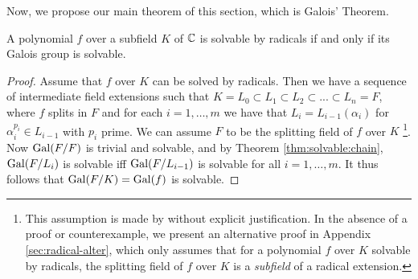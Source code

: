 Now, we propose our main theorem of this section, which is Galois' Theorem. 

\begin{theorem}\label{thm:galois-theorem}
	A polynomial $f$ over a subfield $K$ of $\mathbb C$ is solvable by radicals if and only if its Galois group is solvable.
\end{theorem}

\begin{proof}
	Assume that $f$ over $K$ can be solved by radicals. Then we have a sequence of intermediate field extensions such that $K = L_0 \subset L_1 \subset L_2 \subset ... \subset L_n =F$, where $f$ splits in $F$ and for each $i = 1, \dots, m$ we have that  $L_i = L_{i-1} (\alpha_i)$ for $\alpha_i ^ {p_i} \in L_{i-1}$ with $p_i$ prime. We can assume $F$ to be the splitting field of $f$ over $K$ \footnote[2]{This assumption is made by \cite[p.~75]{introduction-to-galois-theory} without explicit justification. In the absence of a proof or counterexample, we present an alternative proof in Appendix \ref{sec:radical-alter}, which only assumes that for a polynomial $f$ over $K$ solvable by radicals, the splitting field of $f$ over $K$ is a \textit{subfield} of a radical extension.}.
Now $\operatorname{Gal}(F / F)$ is trivial and solvable, and by Theorem \ref{thm:solvable:chain}, $\operatorname{Gal}(F / L_i)$ is solvable iff $\operatorname{Gal}(F / L_{i-1})$ is solvable for all $i = 1, \dots, m$. It thus follows that $\operatorname{Gal}(F/ K) = \operatorname{Gal}(f)$ is solvable. 

\end{proof}
